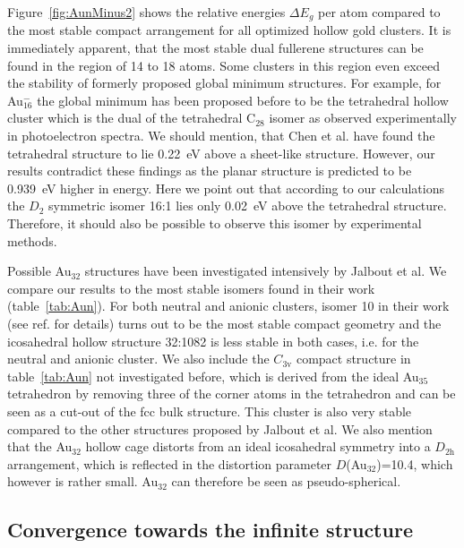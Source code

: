 Figure~\ref{fig:AunMinus2} shows the relative energies $\Delta E_g$ per atom
compared to the most stable compact arrangement for all optimized hollow gold
clusters.  It is immediately apparent, that the most stable dual fullerene
structures can be found in the region of 14 to 18 atoms. Some clusters in this
region even exceed the stability of formerly proposed global minimum
structures. For example, for Au$_{16}^-$ the global minimum has been proposed
before to be the tetrahedral hollow
cluster\autocite{Schooss_Determiningsizedependentstructure_2010,Lechtken_Structuredeterminationgold_2009}
which is the dual of the tetrahedral C$_{28}$ isomer as observed experimentally
in photoelectron spectra.\autocite{Bulusu_Evidencehollowgolden_2006} We should
mention, that Chen et al. have found the tetrahedral structure to lie 0.22~eV
above a sheet-like structure.\autocite{Chen_Structuresneutralanionic_2010}
However, our results contradict these findings as the planar structure is
predicted to be 0.939~eV higher in energy.  Here we point out that according to
our calculations the $D_\mathrm{2}$ symmetric isomer 16:1 lies only 0.02~eV above the
tetrahedral structure.  Therefore, it should also be possible to observe this
isomer by experimental methods.

Possible Au$_{32}$ structures have been investigated intensively by Jalbout et
al.\autocite{Jalbout_LowSymmetryStructuresAu_2008} We compare our results to
the most stable isomers found in their work (table~\ref{tab:Aun}). For both
neutral and anionic clusters, isomer 10 in their work (see
ref. \cite{Jalbout_LowSymmetryStructuresAu_2008} for details) turns out to
be the most stable compact geometry and the icosahedral hollow structure
32:1082 is less stable in both cases, i.e. for the neutral and anionic cluster.
We also include the $C_\mathrm{3v}$ compact structure in table~\ref{tab:Aun} not
investigated before, which is derived from the ideal Au$_{35}$ tetrahedron by
removing three of the corner atoms in the tetrahedron and can be seen as a
cut-out of the fcc bulk structure. This cluster is also very stable compared to
the other structures proposed by Jalbout et al. We also mention that the
Au$_{32}$ hollow cage distorts from an ideal icosahedral symmetry into a
$D_\mathrm{2h}$ arrangement, which is reflected in the distortion parameter
$D$(Au$_{32}$)=10.4, which however is rather small. Au$_{32}$ can therefore be
seen as pseudo-spherical.
  

\subsection{Convergence towards the infinite structure}

